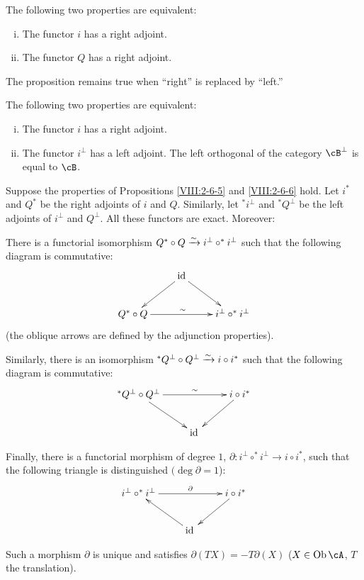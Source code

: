\begin{proposition}\label{VIII:2-6-5}
The following two properties are equivalent:
\begin{enumerate}[(i)]
  \item The functor $i$ has a right adjoint.
  \item The functor $Q$ has a right adjoint.
\end{enumerate}
\end{proposition}

The proposition remains true when “right” is replaced by “left.”

\begin{proposition}\label{VIII:2-6-6}
The following two properties are equivalent:
\begin{enumerate}[(i)]
  \item The functor $i$ has a right adjoint.
  \item The functor $i^\bot$ has a left adjoint. The left orthogonal of the
    category $\cB^\bot$ is equal to $\cB$.
\end{enumerate}
\end{proposition}

\begin{proposition}\label{VIII:2-6-7}
Suppose the properties of Propositions \ref{VIII:2-6-5} and
\ref{VIII:2-6-6} hold. Let $i^\ast$ and $Q^\ast$ be the right adjoints of
$i$ and $Q$. Similarly, let $^\ast i^\bot$ and $^\ast Q^\bot$ be the left
adjoints of $i^\bot$ and $Q^\bot$. All these functors are exact. Moreover:

There is a functorial isomorphism
$Q^\ast\circ Q\xrightarrow\sim i^\bot\circ ^\ast i^\bot$ such that the following
diagram is commutative:
\[\xymatrix{
  & \operatorname{id} \ar[dl] \ar[dr] \\
  Q^\ast \circ Q \ar[rr]^\sim
    & & i^\bot\circ ^\ast i^\bot
}\]
(the oblique arrows are defined by the adjunction properties).

Similarly, there is an isomorphism
$^\ast Q^\bot \circ Q^\bot \xrightarrow\sim i\circ i^\ast$ such that the following
diagram is commutative:
\[\xymatrix{
  ^\ast Q^\bot\circ Q^\bot \ar[rr]^-\sim \ar[dr]
    & & i\circ i^\ast \ar[dl] \\
  & \operatorname{id}{}
}\]

Finally, there is a functorial morphism of degree $1$,
$\partial:i^\bot\circ ^\ast i^\bot \to i\circ i^\ast$, such that the
following triangle is distinguished $(\deg\partial=1$):
\[\xymatrix{
  i^\bot \circ ^\ast i^\bot \ar[rr]^-\partial
    & & i\circ i^\ast \ar[dl] \\
  & \operatorname{id}{} \ar[ul]
}\]

Such a morphism $\partial$ is unique and satisfies
$\partial(TX)=-T\partial(X)$ ($X\in\operatorname{Ob}\cA$, $T$ the
translation).
\end{proposition}

